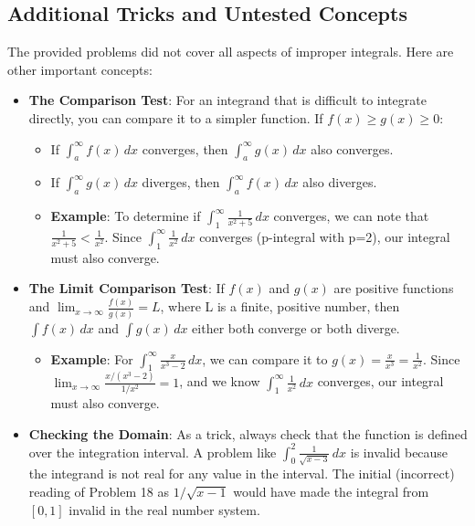 \documentclass{article}
\begin{document}
\subsection{Additional Tricks and Untested Concepts}
The provided problems did not cover all aspects of improper integrals. Here are other important concepts:
\begin{itemize}
    \item \textbf{The Comparison Test}: For an integrand that is difficult to integrate directly, you can compare it to a simpler function. If $f(x) \ge g(x) \ge 0$:
    \begin{itemize}
        \item If $ \int_{a}^{\infty} f(x) \,dx $ converges, then $ \int_{a}^{\infty} g(x) \,dx $ also converges.
        \item If $ \int_{a}^{\infty} g(x) \,dx $ diverges, then $ \int_{a}^{\infty} f(x) \,dx $ also diverges.
        \item \textbf{Example}: To determine if $ \int_{1}^{\infty} \frac{1}{x^2+5} \,dx $ converges, we can note that $ \frac{1}{x^2+5} < \frac{1}{x^2} $. Since $ \int_{1}^{\infty} \frac{1}{x^2} \,dx $ converges (p-integral with p=2), our integral must also converge.
    \end{itemize}
    \item \textbf{The Limit Comparison Test}: If $f(x)$ and $g(x)$ are positive functions and $ \lim_{x \to \infty} \frac{f(x)}{g(x)} = L $, where L is a finite, positive number, then $ \int f(x) \,dx $ and $ \int g(x) \,dx $ either both converge or both diverge.
    \begin{itemize}
        \item \textbf{Example}: For $ \int_{1}^{\infty} \frac{x}{x^3-2} \,dx $, we can compare it to $ g(x) = \frac{x}{x^3} = \frac{1}{x^2} $. Since $ \lim_{x \to \infty} \frac{x/(x^3-2)}{1/x^2} = 1 $, and we know $ \int_{1}^{\infty} \frac{1}{x^2} \,dx $ converges, our integral must also converge.
    \end{itemize}
     \item \textbf{Checking the Domain}: As a trick, always check that the function is defined over the integration interval. A problem like $ \int_{0}^{2} \frac{1}{\sqrt{x-3}} \,dx $ is invalid because the integrand is not real for any value in the interval. The initial (incorrect) reading of Problem 18 as $1/\sqrt{x-1}$ would have made the integral from $[0,1]$ invalid in the real number system.
\end{itemize}
\end{document}
